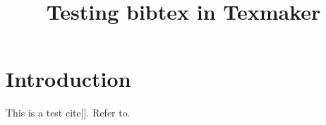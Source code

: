 \documentclass{article}
\begin{document}
\title{Testing bibtex in Texmaker}
\maketitle

\section{Introduction}
This is a test cite[\cite{hartle2003gravity}].
Refer to\cite{abramowitz+stegun}.



%
\end{document}
